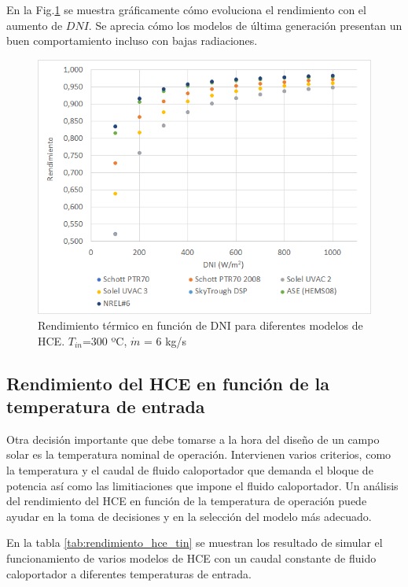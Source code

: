 En la Fig.\ref{fig:test1a} se muestra gráficamente cómo evoluciona el rendimiento con el aumento de $DNI$.  Se aprecia cómo los  modelos de última generación presentan un buen comportamiento incluso con bajas radiaciones.

\begin{figure}[h!]
\includegraphics[width=0.9\linewidth]{images/rendimiento_dni.png}
\caption{Rendimiento térmico en función de DNI para diferentes modelos de HCE. $T_{in}$=300 ºC, $\dot m$ = 6 kg/s} 
\label{fig:test1a}
\end{figure}


\subsection{Rendimiento del HCE en función de la temperatura de entrada}

Otra decisión importante que debe tomarse a la hora del diseño de  un campo solar es la temperatura nominal de operación. Intervienen varios criterios, como la temperatura y el caudal de fluido caloportador que demanda el bloque de potencia así como las limitiaciones que impone el fluido caloportador.  Un análisis del rendimiento del HCE en función de la temperatura de operación puede ayudar en la toma de decisiones y  en la selección del modelo más adecuado.

En la tabla \ref{tab:rendimiento_hce_tin} se muestran los resultado de simular el funcionamiento de varios modelos de HCE con un caudal constante de fluido caloportador a diferentes temperaturas de entrada.

